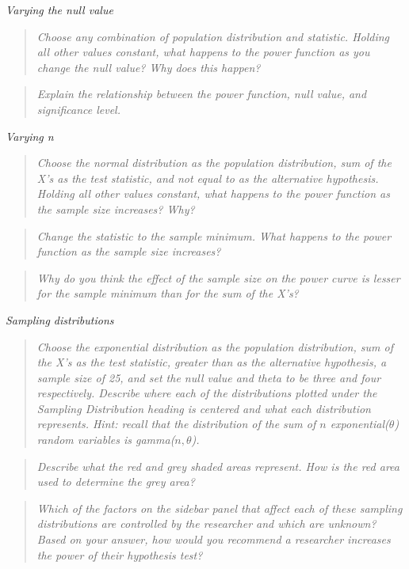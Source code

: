 \documentclass{TISE}
\begin{document}
\textit{Varying the null value}

\begin{quote}
	\textit{Choose any combination of population distribution and statistic. Holding all other values constant, what happens to the power function as you change the null value? Why does this happen?}
\end{quote}

\begin{quote}
	\textit{Explain the relationship between the power function, null value, and significance level.}
\end{quote}

\textit{Varying n}

\begin{quote}
	\textit{Choose the normal distribution as the population distribution, sum of the X's as the test statistic, and not equal to as the alternative hypothesis. Holding all other values constant, what happens to the power function as the sample size increases? Why?}
\end{quote}

\begin{quote}
	\textit{Change the statistic to the sample minimum. What happens to the power function as the sample size increases?}
\end{quote}

\begin{quote}
	\textit{Why do you think the effect of the sample size on the power curve is lesser for the sample minimum than for the sum of the X's?}
\end{quote}

\textit{Sampling distributions}

\begin{quote}
	\textit{Choose the exponential distribution as the population distribution, sum of the X's as the test statistic, greater than as the alternative hypothesis, a sample size of 25, and set the null value and theta to be three and four respectively. Describe where each of the distributions plotted under the Sampling Distribution heading is centered and what each distribution represents. Hint: recall that the distribution of the sum of $n$ exponential($\theta$) random variables is gamma($n, \theta$).}
\end{quote}

\begin{quote}
	\textit{Describe what the red and grey shaded areas represent. How is the red area used to determine the grey area?}
\end{quote}

\begin{quote}
	\textit{Which of the factors on the sidebar panel that affect each of these sampling distributions are controlled by the researcher and which are unknown? Based on your answer, how would you recommend a researcher increases the power of their hypothesis test?}
\end{quote}
\end{document}
